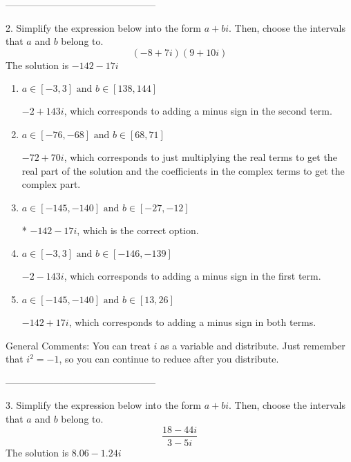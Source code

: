 \documentclass{article}[14pt]
\begin{document}
-----------------------------------------------

2. Simplify the expression below into the form $a+bi$. Then, choose the intervals that $a$ and $b$ belong to.
$$ (-8  + 7 i)(9  + 10 i) $$ 
The solution is $ -142  - 17 i $ 

\begin{enumerate}[label=\Alph*.] 
\item $ a \in [-3, 3] \text{ and } b \in [138, 144] $ 

  $-2  + 143 i$, which corresponds to adding a minus sign in the second term. 
\item $ a \in [-76, -68] \text{ and } b \in [68, 71] $ 

  $-72  + 70 i$, which corresponds to just multiplying the real terms to get the real part of the solution and the coefficients in the complex terms to get the complex part. 
\item $ a \in [-145, -140] \text{ and } b \in [-27, -12] $ 

 * $-142  - 17 i$, which is the correct option. 
\item $ a \in [-3, 3] \text{ and } b \in [-146, -139] $ 

  $-2  - 143 i$, which corresponds to adding a minus sign in the first term. 
\item $ a \in [-145, -140] \text{ and } b \in [13, 26] $ 

  $-142  + 17 i$, which corresponds to adding a minus sign in both terms. 
\end{enumerate} 
 
General Comments: You can treat $i$ as a variable and distribute. Just remember that $i^2=-1$, so you can continue to reduce after you distribute.

-----------------------------------------------

3. Simplify the expression below into the form $a+bi$. Then, choose the intervals that $a$ and $b$ belong to.
$$ \frac{18  - 44 i}{3  - 5 i} $$ 
The solution is $ 8.06  - 1.24 i $ 
\end{document}
